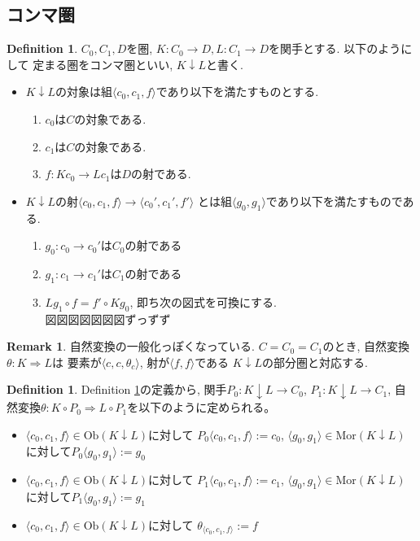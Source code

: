 \documentclass[a4paper,10pt]{article}
\theoremstyle{definition}
\newtheorem{definition}[thm]{\bfseries Definition}
\newtheorem{remark}[thm]{\bfseries Remark}    %
\begin{document}
\subsection{コンマ圏}
\begin{definition}
    \label{comma}
    $C_0, C_1, D$を圏, $K: C_0 \rightarrow D, L: C_1 \rightarrow D$を関手とする. 以下のようにして
    定まる圏をコンマ圏といい, $K \downarrow L$と書く.
    \begin{itemize}
        \item $K \downarrow L$の対象は組$\langle c_0, c_1, f \rangle$であり以下を満たすものとする.
        \begin{enumerate}[(1)]
            \item $c_0$は$C$の対象である.
            \item $c_1$は$C$の対象である.
            \item $f: K c_0 \rightarrow L c_1$は$D$の射である.
        \end{enumerate}
        \item $K \downarrow L$の射$\langle c_0, c_1, f \rangle \rightarrow \langle c_0', c_1', f' \rangle$
        とは組$\langle g_0, g_1 \rangle$であり以下を満たすものである.
        \begin{enumerate}[(1)]
            \item $g_0: c_0 \rightarrow c_0'$は$C_0$の射である
            \item $g_1: c_1 \rightarrow c_1'$は$C_1$の射である
            \item $L g_1 \circ f = f' \circ K g_0$, 即ち次の図式を可換にする.\\
            図図図図図図図ずっずず
        \end{enumerate}
    \end{itemize}
\end{definition}
\begin{remark}
    自然変換の一般化っぽくなっている. $C = C_0 = C_1$のとき, 自然変換$\theta: K \Rightarrow L$は
    要素が$ \langle c, c, \theta_c \rangle$,
    射が$\langle f,f \rangle$である
    $K \downarrow L$の部分圏と対応する.
\end{remark}
\begin{definition}
    Definition \ref{comma}の定義から, 関手$P_0: K \downarrow L \rightarrow C_0$,
    $P_1: K \downarrow L \rightarrow C_1$, 自然変換$\theta: K \circ P_0 \Rightarrow L \circ P_1$を以下のように定められる。
    \begin{itemize}
        \item $\langle c_0, c_1, f \rangle \in \textrm{Ob}(K \downarrow L)$に対して
        $P_0 \langle c_0, c_1, f \rangle:=c_0$, $\langle g_0, g_1 \rangle \in \textrm{Mor}(K \downarrow L)$
        に対して$P_0 \langle g_0, g_1\rangle:=g_0$
        \item $\langle c_0, c_1, f \rangle \in \textrm{Ob}(K \downarrow L)$に対して
        $P_1 \langle c_0, c_1, f \rangle:=c_1$, $\langle g_0, g_1 \rangle \in \textrm{Mor}(K \downarrow L)$
        に対して$P_1 \langle g_0, g_1\rangle:=g_1$
        \item $\langle c_0, c_1, f \rangle \in \textrm{Ob}(K \downarrow L)$に対して
        $\theta_{\langle c_0, c_1, f \rangle}:=f$
    \end{itemize}
\end{definition}
\end{document}
